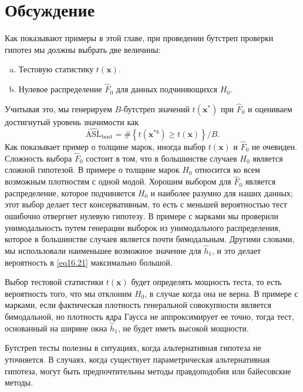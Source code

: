 \section{Обсуждение}

Как показывают примеры в этой главе, при проведении бутстреп проверки гипотез мы должны выбрать две величины:
\begin{enumerate}[(a)]
    \item Тестовую статистику $t(\mathbf{x})$.
    \item Нулевое распределение $\hat{F}_0$ для данных подчиняющихся $H_0$.
\end{enumerate}

Учитывая это, мы генерируем $B$-бутстреп значений $t(\mathbf{x}^{*})$ при $\hat{F}_0$ и оцениваем достигнутый уровень значимости как
\begin{equation}\label{eq16.24}
    \widehat{\text{ASL}}_{\text{boot}} = \#\left\{t(\mathbf{x}^{*b}) \geq t(\mathbf{x})\right\}/B.
\end{equation}
Как показывает пример о толщине марок, иногда выбор $t(\mathbf{x})$ и $\hat{F}_0$ не очевиден. Сложность выбора $\hat{F}_0$ состоит в том, что в большинстве случаев $H_0$ является сложной гипотезой. В примере о толщине марок $H_0$ относится ко всем возможным плотностям с одной модой. Хорошим выбором для $\hat{F}_0$ является распределение, которое подчиняется $H_0$ и наиболее разумно для наших данных; этот выбор делает тест консервативным, то есть с меньшей вероятностью тест ошибочно отвергнет нулевую гипотезу. В примере с марками мы проверили унимодальность путем генерации выборок из унимодального распределения, которое в большинстве случаев является почти бимодальным. Другими словами, мы использовали наименьшее возможное значение для $\hat{h}_1$, и это делает вероятность в \ref{eq16.21} максимально большой.

Выбор тестовой статистики $t(\mathbf{x})$ будет определять мощность теста, то есть вероятность того, что мы отклоним $H_0$, в случае когда она не верна. В примере с марками, если фактическая плотность генеральной совокупности является бимодальной, но плотность ядра Гаусса не аппроксимирует ее точно, тогда тест, основанный на ширине окна $\hat{h}_1$, не будет иметь высокой мощности.

Бутстреп тесты полезны в ситуациях, когда альтернативная гипотеза не уточняется. В случаях, когда существует параметрическая альтернативная гипотеза, могут быть предпочтительны методы правдоподобия или байесовские методы.